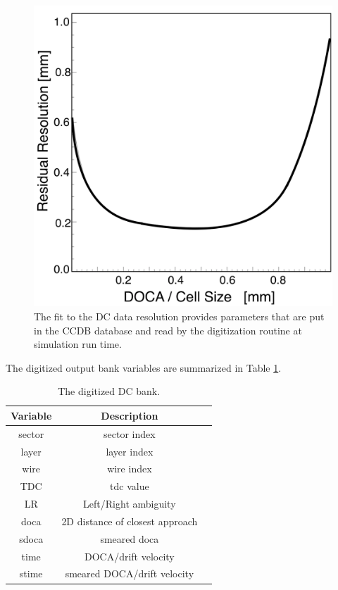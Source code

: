 \begin{figure}
	\centering
	\includegraphics[width=0.99\columnwidth,keepaspectratio]{img/dcResolution.png}
	\caption{The fit to the DC data resolution provides parameters that are put in the CCDB database and read by
    the digitization routine at simulation run time.}
	\label{fig:dcResolution}
\end{figure}

The digitized output bank variables are summarized in Table \ref{tab:dcBank}.

\begin{table}[h]
	\begin{center}
		\begin{tabular}{| c | c | c |}
			\hline \hline
			Variable   & Description \\
			\hline
               sector  &                    sector index   \\
                layer  &                     layer index   \\
                 wire  &                      wire index   \\
                  TDC  &                       tdc value   \\
                   LR  &            Left/Right ambiguity   \\
                 doca  & 2D distance of closest approach   \\
                sdoca  &                    smeared doca   \\
                 time  &           DOCA/drift velocity    \\
                stime  &   smeared DOCA/drift velocity    \\
			\hline \hline
		\end{tabular}
	\end{center}
	\caption{The digitized DC bank.}\label{tab:dcBank}
\end{table}


